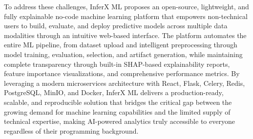 To address these challenges, InferX ML proposes an open-source, lightweight, and fully explainable no-code machine learning platform that empowers non-technical users to build, evaluate, and deploy predictive models across multiple data modalities through an intuitive web-based interface. The platform automates the entire ML pipeline, from dataset upload and intelligent preprocessing through model training, evaluation, selection, and artifact generation, while maintaining complete transparency through built-in SHAP-based explainability reports, feature importance visualizations, and comprehensive performance metrics. By leveraging a modern microservices architecture with React, Flask, Celery, Redis, PostgreSQL, MinIO, and Docker, InferX ML delivers a production-ready, scalable, and reproducible solution that bridges the critical gap between the growing demand for machine learning capabilities and the limited supply of technical expertise, making AI-powered analytics truly accessible to everyone regardless of their programming background.\vspace{0.3cm}

\newpage
